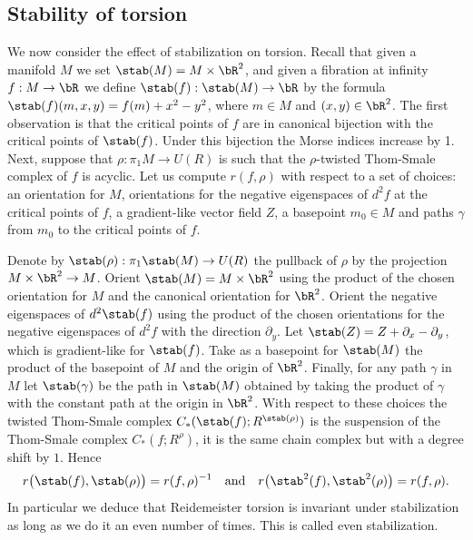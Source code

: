 \subsection{Stability of torsion}\label{Section: stability of torsion}
We now consider the effect of stabilization on torsion. Recall that given a manifold $M$ we set $\stab (M)=M \times \bR^2$, and given a fibra\-tion at infinity $f: M \to \bR$ we define $\stab (f): \stab (M) \to \bR$ by the formula $\stab (f)(m,x,y)=f(m) + x^2 - y^2$, where $m\in M$ and $(x,y) \in \bR^2$. The first obser\-vation is that the critical points of $f$ are in canonical bijection with the critical points of $\stab (f)$. Under this bijection the Morse indices increase by 1. Next, suppose that $\rho: \pi_1M \to U(R)$ is such that the $\rho$-twisted Thom-Smale complex of $f$ is acyclic. Let us compute $r(f,\rho)$ with respect to a set of choices: an orientation for $M$, orientations for the negative eigenspaces of $d^2f$ at the critical points of $f$, a gradient-like vector field $Z$, a basepoint $m_0\in M$ and paths $\gamma$ from $m_0$ to the critical points of $f$.

Denote by $\stab (\rho) : \pi_1 \stab (M) \to U(R)$ the pullback of $\rho$ by the projection \hbox{$M \times \bR^2 \to M$}. Orient $\stab (M)=M \times \bR^2$ using the product of the chosen orientation for $M$ and the canonical orientation for $\bR^2$. Orient the negative eigenspaces of $d^2 \stab (f)$ using the product of the chosen orientations for the negative eigenspaces of $d^2f$ with the direction $\partial_y$. Let $\stab (Z) = Z + \partial_x - \partial_y$, which is gradient-like for $\stab (f)$. Take as a basepoint for $\stab (M)$ the product of the basepoint of $M$ and the origin of $\bR^2$. Finally, for any path $\gamma$ in $M$ let $\stab (\gamma)$ be the path in $\stab (M)$ obtained by taking the product of $\gamma$ with the constant path at the origin in $\bR^2$. With respect to these choices the twisted Thom-Smale complex $C_*(\stab (f); R^{\stab (\rho)} )$ is the suspension of the Thom-Smale complex $C_*(f; R^\rho)$, \ie it is the same chain complex but with a degree shift by $1$. Hence
\[ r\big( \stab (f), \stab (\rho)\big) = r(f, \rho)^{-1} \quad \text{and} \quad r\big( \stab ^2(f), \stab ^2(\rho)\big) = r(f, \rho).\]
In particular we deduce that Reidemeister torsion is invariant under stabilization as long as we do it an even number of times. This is called even stabilization.

